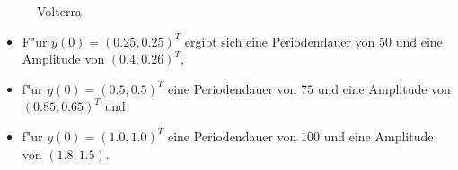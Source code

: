 \documentclass[a4paper,12pt]{article}
\begin{document}
\begin{figure}
  \centering
  \caption{Volterra}
  \label{fig:volterra}
\end{figure}

\begin{itemize}
\item F"ur $y(0) = (0.25,  0.25)^T$ ergibt sich eine Periodendauer von
  $50$ und eine Amplitude von $(0.4 , 0.26)^T$, 
\item f"ur $y(0) = (0.5,  0.5)^T$ eine Periodendauer von $75$ und eine
  Amplitude von $(0.85 , 0.65)^T$ und
\item f"ur $y(0) = (1.0 , 1.0)^T$ eine Periodendauer von $100$ und
  eine Amplitude von $(1.8 , 1.5)$.
\end{itemize}
 
\end{document}
